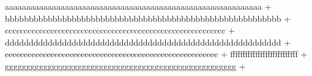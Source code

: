 {aaaaaaaaaaaaaaaaaaaaaaaaaaaaaaaaaaaaaaaaaaaaaaaaaaaaaaaaaaaa} + {bbbbbbbbbbbbbbbbbbbbbbbbbbbbbbbbbbbbbbbbbbbbbbbbbbbbbbbbbb} + {cccccccccccccccccccccccccccccccccccccccccccccccccccccccccc} + {dddddddddddddddddddddddddddddddddddddddddddddddddddddddddd} + {eeeeeeeeeeeeeeeeeeeeeeeeeeeeeeeeeeeeeeeeeeeeeeeeeeeeeeee} + {fffffffffffffffffffffffffff} + {gggggggggggggggggggggggggggggggggggggggggggggggggggggg} +
